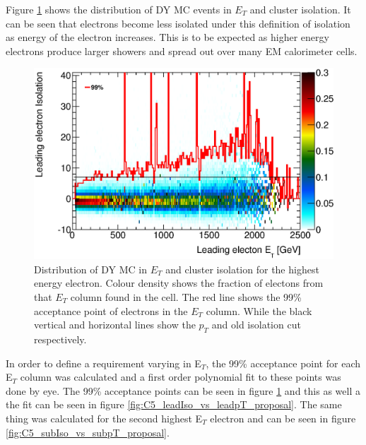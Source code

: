 Figure \ref{fig:C5_leadIso_vs_leadpT} shows the distribution of DY MC events in $E_{T}$ and cluster isolation. It can be seen that electrons become less isolated under this definition of isolation as energy of the electron increases. This is to be expected as higher energy electrons produce larger showers and spread out over many EM calorimeter cells. 

   \begin{figure}[h!]
      \begin{center}
      \includegraphics[scale=0.7]{images/C5_leadIso_vs_leadpT.eps}
      \end{center}
   \caption{Distribution of DY MC in $E_{T}$ and cluster isolation for the highest energy electron. Colour density shows the fraction of electons from that $E_{T}$ column found in the cell. The red line shows the 99\% acceptance point of electrons in the $E_{T}$ column. While the black vertical and horizontal lines show the $p_{T}$ and old isolation cut respectively.}
   \label{fig:C5_leadIso_vs_leadpT}
   \end{figure}


In order to define a requirement varying in E$_{T}$, the 99\% acceptance point for each E$_{T}$ column was calculated and a first order polynomial fit to these points was done by eye. The 99\% acceptance points can be seen in figure \ref{fig:C5_leadIso_vs_leadpT} and this as well a the fit can be seen in figure \ref{fig:C5_leadIso_vs_leadpT_proposal}. The same thing was calculated for the second highest E$_{T}$ electron and can be seen in figure \ref{fig:C5_subIso_vs_subpT_proposal}.



